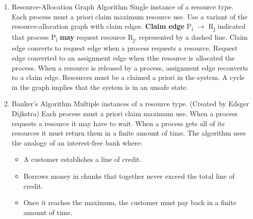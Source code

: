 \documentclass{article}%
\begin{document}
\begin{enumerate}
\item Resource-Allocation Graph Algorithm
\label{sec:org17d9637}
Single instance of a resource type.
Each process must a priori claim maximum resource use.
Use a variant of the resource-allocation graph with claim edges.
\textbf{Claim edge} P\textsubscript{i} \(\rightarrow\) R\textsubscript{j} indicated that process P\textsubscript{i} \textbf{may} request resource R\textsubscript{j}, represented by a dashed line.
Claim edge converts to request edge when a process requests a resource.
Request edge converted to an assignment edge when tthe resource is allocated the process.
When a resource is released by a process, assignment edge reconverts to a claim edge.
Resources must be a claimed a priori in the system.
A cycle in the graph implies that the system is in an unsafe state.

\item Banker's Algorithm
\label{sec:org895e8a5}
Multiple instances of a resource type.
(Created by Edsger Dijkstra)
Each process must a priori claim maximum use.
When a process requests a resource it may have to wait.
When a process gets all of its resources it must return them in a finite amount of time.
The algorithm uses the analogy of an interest-free bank where:
\begin{itemize}
\item A customer establishes a line of credit.
\item Borrows money in chunks that together never exceed the total line of credit.
\item Once it reaches the maximum, the customer must pay back in a finite amount of time.
\end{itemize}


\end{enumerate}
\end{document}
